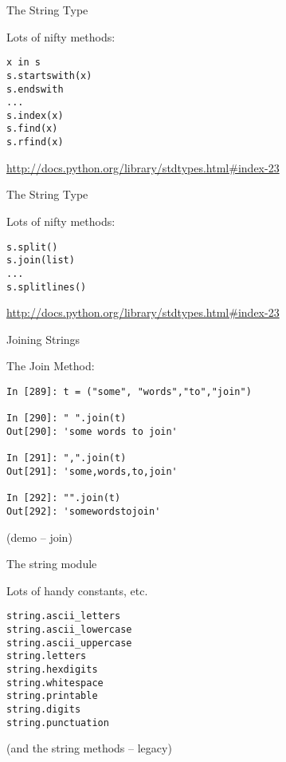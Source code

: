 \documentclass{beamer}
\begin{document}
\begin{frame}[fragile]{The String Type}

{\Large Lots of nifty methods:}

\begin{verbatim}
x in s
s.startswith(x)
s.endswith
...
s.index(x)
s.find(x)
s.rfind(x)
\end{verbatim}

\url{http://docs.python.org/library/stdtypes.html#index-23}

\end{frame} 

\begin{frame}[fragile]{The String Type}

{\Large Lots of nifty methods:}

\begin{verbatim}
s.split()
s.join(list)
...
s.splitlines()
\end{verbatim}

\url{http://docs.python.org/library/stdtypes.html#index-23}
\vfill

\end{frame} 

\begin{frame}[fragile]{Joining Strings}

{\Large The Join Method:}

\vfill
\begin{verbatim}
In [289]: t = ("some", "words","to","join")

In [290]: " ".join(t)
Out[290]: 'some words to join'

In [291]: ",".join(t)
Out[291]: 'some,words,to,join'

In [292]: "".join(t)
Out[292]: 'somewordstojoin'
\end{verbatim}

\vfill
(demo -- join)

\end{frame} 

\begin{frame}[fragile]{The string module}

{\Large Lots of handy constants, etc.}
\begin{verbatim}
string.ascii_letters
string.ascii_lowercase 
string.ascii_uppercase  
string.letters
string.hexdigits 
string.whitespace
string.printable
string.digits
string.punctuation      
\end{verbatim}

\vfill
(and the string methods -- legacy)
\end{frame} 
\end{document}

